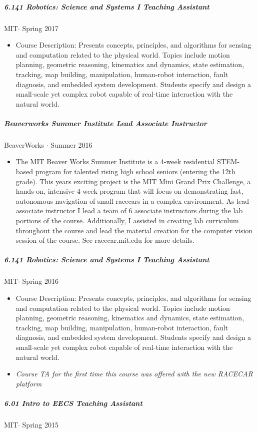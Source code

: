 \documentclass[10pt,letterpaper]{article}
\begin{document}
\subparagraph{6.141 Robotics: Science and Systems I Teaching Assistant}
MIT$\cdot$ Spring 2017
\begin{itemize}
\item Course Description: Presents concepts, principles, and algorithms for sensing and computation related to the physical world. Topics include motion planning, geometric reasoning, kinematics and dynamics, state estimation, tracking, map building, manipulation, human-robot interaction, fault diagnosis, and embedded system development. Students specify and design a small-scale yet complex robot capable of real-time interaction with the natural world. 
\end{itemize}
\subparagraph{Beaverworks Summer Institute Lead Associate Instructor}
 BeaverWorks $\cdot$ Summer 2016
\begin{itemize}
\item The MIT Beaver Works Summer Institute is a 4-week residential STEM-based program for talented rising high school seniors (entering the 12th grade). This years exciting project is the MIT Mini Grand Prix Challenge, a hands-on, intensive 4-week program that will focus on demonstrating fast, autonomous navigation of small racecars in a complex environment. As lead associate instructor I lead a team of 6 associate instructors during the lab portions of the course.  Additionally, I assisted in creating lab curriculum throughout the course and lead the material creation for the computer vision session of the course. See racecar.mit.edu for more details.
\end{itemize}
\subparagraph{6.141 Robotics: Science and Systems I Teaching Assistant}
MIT$\cdot$ Spring 2016
\begin{itemize}
\item Course Description: Presents concepts, principles, and algorithms for sensing and computation related to the physical world. Topics include motion planning, geometric reasoning, kinematics and dynamics, state estimation, tracking, map building, manipulation, human-robot interaction, fault diagnosis, and embedded system development. Students specify and design a small-scale yet complex robot capable of real-time interaction with the natural world. 
\item {\em Course TA for the first time this course was offered with the new RACECAR platform}
\end{itemize}
\subparagraph{6.01 Intro to EECS Teaching Assistant}
MIT$\cdot$ Spring 2015
\end{document}
